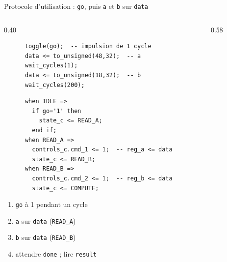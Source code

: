 \begin{frame}[fragile,t]{Protocole d'utilisation : \texttt{go}, puis \texttt{a} et \texttt{b} sur \texttt{data}}
  \begin{columns}[T]
    \begin{column}{0.40\textwidth}
      \begin{lstlisting}
      toggle(go);  -- impulsion de 1 cycle
      data <= to_unsigned(48,32);  -- a
      wait_cycles(1);
      data <= to_unsigned(18,32);  -- b
      wait_cycles(200);
      \end{lstlisting}
      \vspace{1.5mm}
      \begin{lstlisting}
      when IDLE =>
        if go='1' then
          state_c <= READ_A;
        end if;
      when READ_A =>
        controls_c.cmd_1 <= 1;  -- reg_a <= data
        state_c <= READ_B;
      when READ_B =>
        controls_c.cmd_2 <= 1;  -- reg_b <= data
        state_c <= COMPUTE;
      \end{lstlisting}
      \vspace{1.5mm}

      {\footnotesize
      \begin{enumerate}\setlength\itemsep{0pt}
        \item \texttt{go} à 1 pendant un cycle
        \item \texttt{a} sur \texttt{data} (\texttt{READ\_A})
        \item \texttt{b} sur \texttt{data} (\texttt{READ\_B})
        \item attendre \texttt{done} ; lire \texttt{result}
      \end{enumerate}}

    \end{column}

    \begin{column}{0.58\textwidth}
    \end{column}
  \end{columns}
\end{frame}

